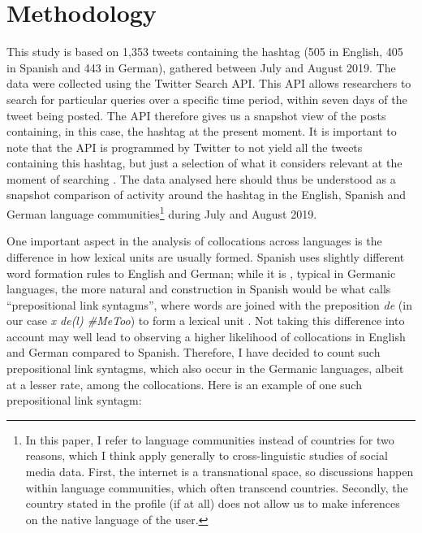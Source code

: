 \documentclass[output=paper,english,spanish,german,english]{langsci/langscibook}
\begin{document}
\section{Methodology}\label{sec:meth}

This study is based on 1,353 tweets containing the \mt hashtag (505 in English, 405 in Spanish and 443 in German), gathered between July and August 2019. The data were collected using the Twitter Search API. This API allows researchers to search for particular queries over a specific time period, within seven days of the tweet being posted. The API therefore gives us a snapshot view of the posts containing, in this case, the \mt hashtag at the present moment. It is important to note that the API is programmed by Twitter to not yield all the tweets containing this hashtag, but just a selection of what it considers relevant at the moment of searching \parencites[see also][7]{zappavigna18}{boyrat19}. The data analysed here should thus be understood as a snapshot comparison of activity around the \mt hashtag in the English, Spanish and German language communities\footnote{In this paper, I refer to language communities instead of countries for two reasons, which I think apply generally to cross-linguistic studies of social media data. First, the internet is a transnational space, so discussions happen within language communities, which often transcend countries. Secondly, the country stated in the profile (if at all) does not allow us to make inferences on the native language of the user.} during July and August 2019.

One important aspect in the analysis of collocations across languages is the difference in how lexical units are usually formed. Spanish uses slightly different word formation rules to English and German; while it is , typical in Germanic languages, the more natural and  construction in Spanish would be what \textcite[85]{lang90} calls \enquote{prepositional link syntagms}, where words are joined with the preposition \textit{de} (in our case \textit{x de(l) \#MeToo}) to form a lexical unit \parencite[85]{lang90}. Not taking this difference into account may well lead to observing a higher likelihood of collocations in English and German compared to Spanish. Therefore, I have decided to count such prepositional link syntagms, which also occur in the Germanic languages, albeit at a lesser rate, among the collocations. Here is an example of one such prepositional link syntagm:
\end{document}
